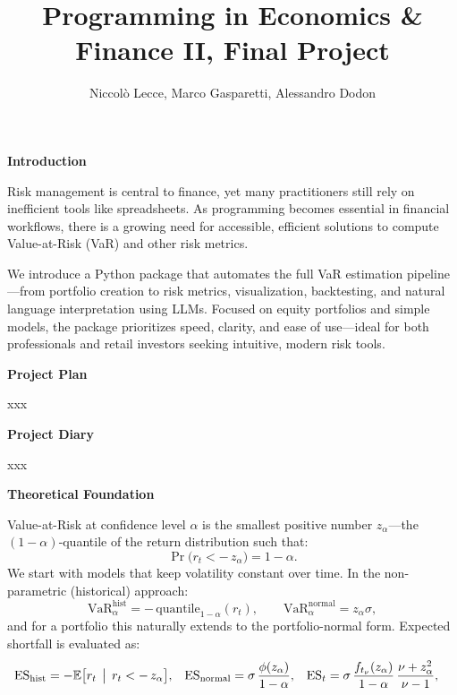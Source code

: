 \documentclass[12pt]{article}
\title{\textbf{\huge Programming in Economics \& Finance II, Final Project}}
\author{Niccol\`o Lecce, Marco Gasparetti, Alessandro Dodon}
\date{}
\begin{document}
\maketitle

\textbf{Introduction}

Risk management is central to finance, yet many practitioners still rely on inefficient tools like spreadsheets. As programming becomes essential in financial workflows, there is a growing need for accessible, efficient solutions to compute Value-at-Risk (VaR) and other risk metrics.

We introduce a Python package that automates the full VaR estimation pipeline—from portfolio creation to risk metrics, visualization, backtesting, and natural language interpretation using LLMs. Focused on equity portfolios and simple models, the package prioritizes speed, clarity, and ease of use—ideal for both professionals and retail investors seeking intuitive, modern risk tools.


\textbf{Project Plan}

xxx


\textbf{Project Diary}

xxx


\textbf{Theoretical Foundation}


\vspace{1em}
\underline{}

\vspace{0.6em}

Value-at-Risk at confidence level $\alpha$ is the smallest positive number $z_{\alpha}$—the $(1-\alpha)$‐quantile of the return distribution such that: 
\[
\Pr\bigl(r_{t}< -\,z_{\alpha}\bigr)=1-\alpha.
\]
We start with models that keep volatility constant over time.  In the non-parametric (historical) approach:
\[
\mathrm{VaR}_{\alpha}^{\mathrm{hist}}=-\,\text{quantile}_{1-\alpha}(r_{t}),
\qquad
\mathrm{VaR}_{\alpha}^{\mathrm{normal}}=z_{\alpha}\sigma,
\]
and for a portfolio this naturally extends to the portfolio-normal form. Expected shortfall is evaluated as:
\[
\begin{aligned}
\mathrm{ES}_{\mathrm{hist}} &= -\mathbb{E}\bigl[r_{t}\,\bigm|\,r_{t}< -\,z_{\alpha}\bigr], &
\mathrm{ES}_{\mathrm{normal}} &= \sigma\,\frac{\phi(z_{\alpha})}{1-\alpha}, &
\mathrm{ES}_{t} &= \sigma\,\frac{f_{t_{\nu}}(z_{\alpha})}{1-\alpha}\,\frac{\nu+z_{\alpha}^{2}}{\nu-1},
\end{aligned}
\]
\end{document}
